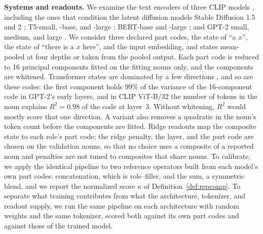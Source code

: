 \documentclass[10pt]{article}
\theoremstyle{plain}
\theoremstyle{remark}
\begin{document}
\textbf{Systems and readouts.} We examine the text encoders of three CLIP models \citep{radford2021clip}, including the ones that condition the latent diffusion models Stable Diffusion 1.5 and 2 \citep{rombach2022}; T5-small, -base, and -large \citep{raffel2020t5}; BERT-base and -large \citep{devlin2019bert}; and GPT-2 small, medium, and large \citep{radford2019gpt2}. We consider three declared part codes, the state of ``a $x$'', the state of ``there is a $x$ here'', and the input embedding, and states mean-pooled at four depths or taken from the pooled output. Each part code is reduced to 16 principal components fitted on the fitting nouns only, and the components are whitened. Transformer states are dominated by a few directions \citep{ethayarajh2019,timkey2021}, and so are these codes: the first component holds 99\% of the variance of the 16-component code in GPT-2's early layers, and in CLIP ViT-B/32 the number of tokens in the noun explains $R^2 = 0.98$ of the code at layer~3. Without whitening, $R^2$ would mostly score that one direction. A variant also removes a quadratic in the noun's token count before the components are fitted. Ridge readouts map the composite state to each role's part code; the ridge penalty, the layer, and the part code are chosen on the validation nouns, so that no choice uses a composite of a reported noun and penalties are not tuned to composites that share nouns. To calibrate, we apply the identical pipeline to two reference operators built from each model's own part codes: concatenation, which is role--filler, and the sum, a symmetric blend, and we report the normalized score $\kappa$ of Definition~\ref{def:repcomp}. To separate what training contributes from what the architecture, tokenizer, and readout supply, we run the same pipeline on each architecture with random weights and the same tokenizer, scored both against its own part codes and against those of the trained model.
\end{document}
